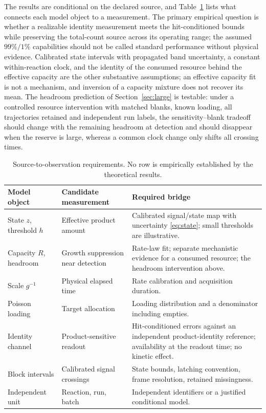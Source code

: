 \documentclass[11pt,a4paper]{article}
\theoremstyle{plain}
\theoremstyle{definition}
\theoremstyle{remark}
\begin{document}
The results are conditional on the declared source, and Table~\ref{tab:bridge} lists what connects each model object to a measurement. The primary empirical question is whether a realizable identity measurement meets the hit-conditioned bounds while preserving the total-count source across its operating range; the assumed $99\%/1\%$ capabilities should not be called standard performance without physical evidence. Calibrated state intervals with propagated band uncertainty, a constant within-reaction clock, and the identity of the consumed resource behind the effective capacity are the other substantive assumptions; an effective capacity fit is not a mechanism, and inversion of a capacity mixture does not recover its mean. The headroom prediction of Section~\ref{sec:large} is testable: under a controlled resource intervention with matched blanks, known loading, all trajectories retained and independent run labels, the sensitivity--blank tradeoff should change with the remaining headroom at detection and should disappear when the reserve is large, whereas a common clock change only shifts all crossing times.

\begin{table}[htbp]\centering\small
\begin{tabular}{>{\raggedright\arraybackslash}p{.17\linewidth}>{\raggedright\arraybackslash}p{.29\linewidth}>{\raggedright\arraybackslash}p{.46\linewidth}}\toprule
Model object & Candidate measurement & Required bridge\\\midrule
State $z$, threshold $h$ & Effective product amount & Calibrated signal/state map with uncertainty \eqref{eq:state}; small thresholds are illustrative.\\
Capacity $R$, headroom & Growth suppression near detection & Rate-law fit; separate mechanistic evidence for a consumed resource; the headroom intervention above.\\
Scale $g^{-1}$ & Physical elapsed time & Rate calibration and acquisition duration.\\
Poisson loading & Target allocation & Loading distribution and a denominator including empties.\\
Identity channel & Product-sensitive readout & Hit-conditioned errors against an independent product-identity reference; availability at the readout time; no kinetic effect.\\
Block intervals & Calibrated signal crossings & State bounds, latching convention, frame resolution, retained missingness.\\
Independent unit & Reaction, run, batch & Independent identifiers or a justified conditional model.\\\bottomrule
\end{tabular}
\caption{Source-to-observation requirements. No row is empirically established by the theoretical results.}\label{tab:bridge}
\end{table}
\end{document}
